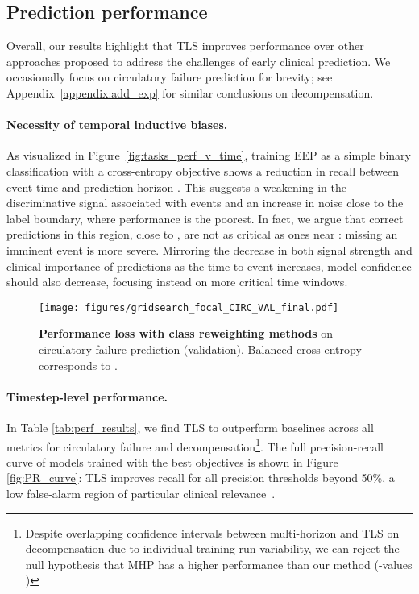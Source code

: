 \documentclass[nohyperref]{article}
\begin{document}
\subsection{Prediction performance}\label{sec:perf-results}

Overall, our results highlight that TLS improves performance over other approaches proposed to address the challenges of early clinical prediction. We occasionally focus on circulatory failure prediction for brevity; see Appendix~\ref{appendix:add_exp} for similar conclusions on decompensation.


\paragraph{Necessity of temporal inductive biases.} As visualized in Figure~\ref{fig:tasks_perf_v_time}, training EEP as a simple binary classification with a cross-entropy objective shows a reduction in recall between event time  and prediction horizon . This suggests a weakening in the discriminative signal associated with events and an increase in noise close to the label boundary, where performance is the poorest. In fact, we argue that correct predictions in this region, close to , are not as critical as ones near : missing an imminent event is more severe. Mirroring the decrease in both signal strength and clinical importance of predictions as the time-to-event increases, model confidence should also decrease, focusing instead on more critical time windows.





\begin{figure}[h]
\centering
    \centering
    \texttt{[image: figures/gridsearch\_focal\_CIRC\_VAL\_final.pdf]}
\caption{\textbf{Performance loss with class reweighting methods} on circulatory failure prediction (validation). Balanced cross-entropy corresponds to .}
\label{fig:focal+weighted}
\end{figure}

\paragraph{Timestep-level performance.} In Table \ref{tab:perf_results}, we find TLS to outperform baselines across all metrics for circulatory failure and decompensation\footnote{Despite overlapping confidence intervals between multi-horizon and TLS on decompensation due to individual training run variability, we can reject the null hypothesis that MHP has a higher performance than our method (-values )}. The full precision-recall curve of models trained with the best objectives is shown in Figure \ref{fig:PR_curve}: TLS improves recall for all precision thresholds beyond 50\%, a low false-alarm region of particular clinical relevance~\citep{sutton2020}.
\end{document}
